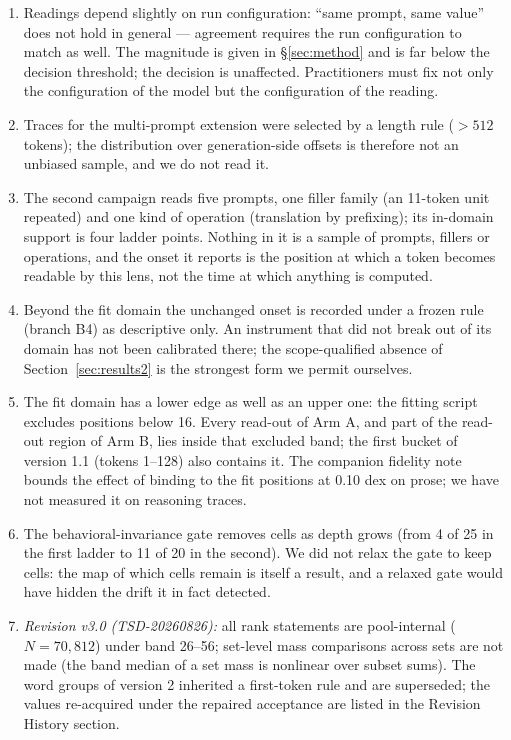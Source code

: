 \documentclass[11pt]{article}
\begin{document}
\begin{enumerate}
  re-aggregation in relative coordinates was frozen and committed before
  it was computed.
\item Readings depend slightly on run configuration: ``same prompt, same
  value'' does not hold in general --- agreement requires the run
  configuration to match as well. The magnitude is given in
  \S\ref{sec:method} and is far below the decision threshold; the
  decision is unaffected. Practitioners must fix not only the
  configuration of the model but the configuration of the reading.
\item Traces for the multi-prompt extension were selected by a length
  rule ($>512$ tokens); the distribution over generation-side offsets is
  therefore not an unbiased sample, and we do not read it.
\item The second campaign reads five prompts, one filler family (an 11-token unit repeated) and one kind of operation (translation by prefixing); its in-domain support is four ladder points. Nothing in it is a sample of prompts, fillers or operations, and the onset it reports is the position at which a token becomes readable by this lens, not the time at which anything is computed.
\item Beyond the fit domain the unchanged onset is recorded under a frozen rule (branch B4) as descriptive only. An instrument that did not break out of its domain has not been calibrated there; the scope-qualified absence of Section~\ref{sec:results2} is the strongest form we permit ourselves.
\item The fit domain has a lower edge as well as an upper one: the fitting script excludes positions below 16. Every read-out of Arm A, and part of the read-out region of Arm B, lies inside that excluded band; the first bucket of version 1.1 (tokens 1--128) also contains it. The companion fidelity note bounds the effect of binding to the fit positions at 0.10 dex on prose; we have not measured it on reasoning traces.
\item The behavioral-invariance gate removes cells as depth grows (from 4 of 25 in the first ladder to 11 of 20 in the second). We did not relax the gate to keep cells: the map of which cells remain is itself a result, and a relaxed gate would have hidden the drift it in fact detected.
\item \emph{Revision v3.0 (TSD-20260826):} all rank statements are pool-internal ($N = 70{,}812$) under band 26--56; set-level mass comparisons across sets are not made (the band median of a set mass is nonlinear over subset sums). The word groups of version 2 inherited a first-token rule and are superseded; the values re-acquired under the repaired acceptance are listed in the Revision History section.

\end{enumerate}
\end{document}
